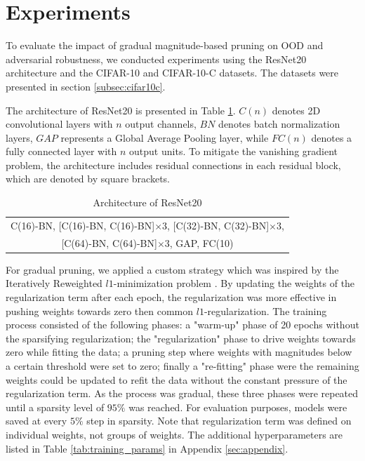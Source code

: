 \section{Experiments}\label{sec:exp}

To evaluate the impact of gradual magnitude-based pruning on OOD and adversarial robustness, we conducted experiments using the
ResNet20 architecture and the CIFAR-10 and CIFAR-10-C datasets. The datasets were presented in section \ref{subsec:cifar10c}.

The architecture of ResNet20 \cite{resnet20} is presented in Table \ref{tab:resnet20}. $C(n)$ denotes 2D convolutional layers with $n$ output channels, $BN$ denotes
batch normalization layers, $GAP$ represents a Global Average Pooling layer, while $FC(n)$ denotes a fully connected layer with $n$ output units. 
To mitigate the vanishing gradient problem, the architecture includes residual connections in each residual block, which are denoted by square brackets.

\begin{table}[H]
\centering
\begin{tabular}{|c|}
    \hline
    C(16)-BN, [C(16)-BN, C(16)-BN]$\times3$, [C(32)-BN, C(32)-BN]$\times3$, \\ {}
    [C(64)-BN, C(64)-BN]$\times3$, GAP, FC(10) \\ \hline
\end{tabular}
\caption{Architecture of ResNet20}
\label{tab:resnet20}
\end{table}

For gradual pruning, we applied a custom strategy which was inspired by the Iteratively Reweighted $l1$-minimization problem \cite{boyd}. By updating 
the weights of the regularization term after each epoch, the regularization was more effective in pushing weights towards zero then common 
$l1$-regularization. The training process consisted of the following phases: a "warm-up" phase of 20 epochs without the sparsifying regularization; 
the "regularization" phase to drive weights towards zero while fitting the data; a pruning step where weights with magnitudes below a certain threshold
were set to zero; finally a "re-fitting" phase were the remaining weights could be updated to refit the data without the constant pressure of 
the regularization term. As the process was gradual, these three phases were repeated until a sparsity level of $95\%$ was reached. For evaluation purposes, 
models were saved at every $5\%$ step in sparsity. Note that regularization term was defined on individual weights, not groups of weights.
The additional hyperparameters are listed in Table \ref{tab:training_params} in Appendix \ref{sec:appendix}.

